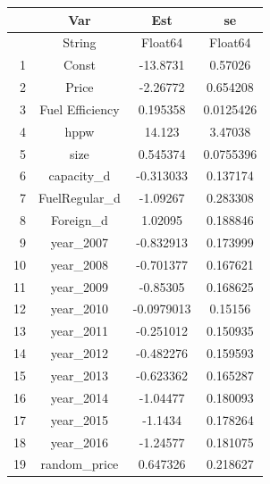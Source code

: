 \documentclass[
  letterpaper,
  DIV=11,
  numbers=noendperiod]{scrreprt}
\begin{document}
\begin{tabular}{r|ccc}
    & Var & Est & se\\
    \hline
    & String & Float64 & Float64\\
    \hline
    1 & Const & -13.8731 & 0.57026 \\
    2 & Price & -2.26772 & 0.654208 \\
    3 & Fuel Efficiency & 0.195358 & 0.0125426 \\
    4 & hppw & 14.123 & 3.47038 \\
    5 & size & 0.545374 & 0.0755396 \\
    6 & capacity\_d & -0.313033 & 0.137174 \\
    7 & FuelRegular\_d & -1.09267 & 0.283308 \\
    8 & Foreign\_d & 1.02095 & 0.188846 \\
    9 & year\_2007 & -0.832913 & 0.173999 \\
    10 & year\_2008 & -0.701377 & 0.167621 \\
    11 & year\_2009 & -0.85305 & 0.168625 \\
    12 & year\_2010 & -0.0979013 & 0.15156 \\
    13 & year\_2011 & -0.251012 & 0.150935 \\
    14 & year\_2012 & -0.482276 & 0.159593 \\
    15 & year\_2013 & -0.623362 & 0.165287 \\
    16 & year\_2014 & -1.04477 & 0.180093 \\
    17 & year\_2015 & -1.1434 & 0.178264 \\
    18 & year\_2016 & -1.24577 & 0.181075 \\
    19 & random\_price & 0.647326 & 0.218627 \\
\end{tabular}
\end{document}

